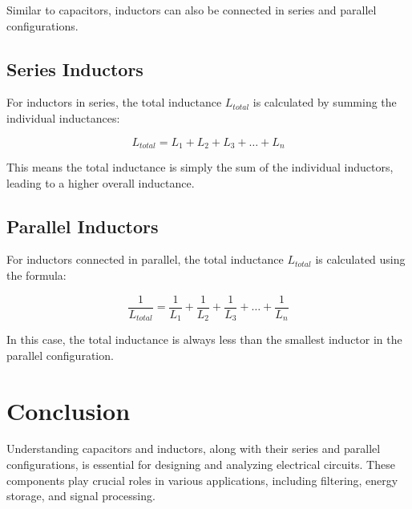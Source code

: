 \documentclass[openany]{book}
\begin{document}
Similar to capacitors, inductors can also be connected in series and parallel configurations.

\subsection{Series Inductors}

For inductors in series, the total inductance \(L_{total}\) is calculated by summing the individual inductances:

\[
L_{total} = L_1 + L_2 + L_3 + \ldots + L_n
\]

This means the total inductance is simply the sum of the individual inductors, leading to a higher overall inductance.

\subsection{Parallel Inductors}

For inductors connected in parallel, the total inductance \(L_{total}\) is calculated using the formula:

\[
\frac{1}{L_{total}} = \frac{1}{L_1} + \frac{1}{L_2} + \frac{1}{L_3} + \ldots + \frac{1}{L_n}
\]

In this case, the total inductance is always less than the smallest inductor in the parallel configuration.

\section{Conclusion}

Understanding capacitors and inductors, along with their series and parallel configurations, is essential for designing and analyzing electrical circuits. These components play crucial roles in various applications, including filtering, energy storage, and signal processing.
\end{document}
